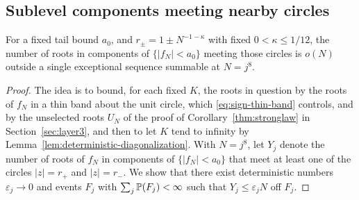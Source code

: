 \subsection{Sublevel components meeting nearby circles}\label{sec:nearby-circles}
\begin{corollary}
\label{cor:crossings}
For a fixed tail bound $a_0$, and
$r_\pm=1\pm N^{-1-\kappa}$ with fixed $0<\kappa\le1/12$, the number
of roots in components of $\{|f_N|<a_0\}$ meeting those circles is
$o(N)$ outside a single exceptional sequence summable at $N=j^8$.
\end{corollary}
\begin{proof}
The idea is to bound, for each fixed $K$, the roots in question by the
roots of $f_N$ in a thin band about the unit circle, which
\eqref{eq:sign-thin-band} controls, and by the unselected roots $U_N$ of
the proof of Corollary~\ref{thm:stronglaw} in Section~\ref{sec:layer3},
and then to let $K$ tend to infinity by
Lemma~\ref{lem:deterministic-diagonalization}. With $N=j^8$, let $Y_j$
denote the number of roots of $f_N$ in components of $\{|f_N|<a_0\}$ that
meet at least one of the circles $|z|=r_+$ and $|z|=r_-$. We show that
there exist deterministic numbers $\varepsilon_j\to0$ and events $F_j$ with
$\sum_j\mathbb P(F_j)<\infty$ such that $Y_j\le\varepsilon_jN$ off $F_j$.


\end{proof}
